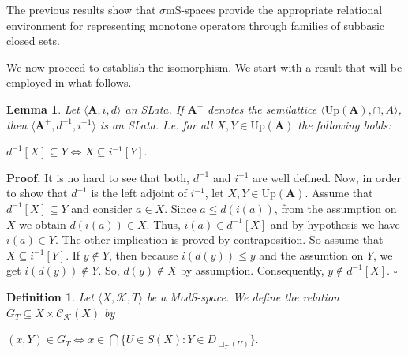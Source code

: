 \documentclass{article}
\newtheorem{definition}{\bf Definition}[section]
\newtheorem{lemma}{\bf Lemma}[section]
\newenvironment{proof}
{\par\noindent\textbf{Proof. }\rm}
{\hfill$\boldsymbol{\square}$\par\vspace{0.3cm}}
\begin{document}
The previous results show that $\sigma$mS-spaces provide the appropriate relational environment for representing monotone operators through families of subbasic closed sets.

\medskip

We now proceed to establish the isomorphism. We start with a result that will be employed in what follows.


\begin{lemma}\label{adjuncion imagen inversa}
    Let $\langle \mathbf{A},i,d \rangle$ an SLata. If $\mathbf{A}^{+}$ denotes the semilattice $\langle \mathrm{Up}(\mathbf{A}), \cap, A\rangle$, then $\langle\mathbf{A}^{+},d^{-1},i^{-1}\rangle$ is an SLata. I.e. for all $X,Y \in \mathrm{Up}(\mathbf{A})$ the following holds:
    \begin{center}
        $d^{-1}[X]\subseteq Y \iff X\subseteq i^{-1}[Y].$
    \end{center}
\end{lemma}
\begin{proof}
    It is no hard to see that both, $d^{-1}$ and $i^{-1}$ are well defined. Now, in order to show that $d^{-1}$ is the left adjoint of $i^{-1}$, let $X,Y \in \mathrm{Up}(\mathbf{A})$. Assume that  $d^{-1}[X]\subseteq Y $ and consider $a \in X$. Since $a \leq d(i(a))$, from the assumption on $X$ we obtain $d(i(a)) \in X$. Thus, $i(a)\in d^{-1}[X]$ and by hypothesis we have $i(a)\in Y$. The other implication is proved by contraposition. So assume that $X\subseteq i^{-1}[Y]$. If $y\notin Y$, then because $i(d(y))\leq y$ and the assumtion on $Y$, we get $i(d(y))\notin Y$. So, $d(y)\notin X$ by assumption. Consequently, $y\notin d^{-1}[X]$. 
\end{proof}

\begin{definition}\label{G_T}
    Let $\langle X, \mathcal{K}, T \rangle$ be a ModS-space. We define the relation $G_T\subseteq X \times \mathcal{C_K}(X)$ by
    \begin{center}
       $ (x,Y) \in G_T \iff x\in \bigcap\{U\in S(X)\colon Y\in D_{\Box_T(U)}\}.$
    \end{center}
\end{definition}
\end{document}
